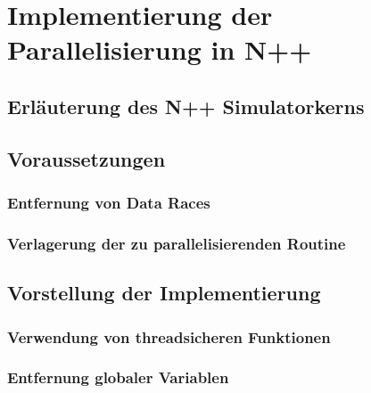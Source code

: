 \chapter{Implementierung der Parallelisierung in N++}
\label{ch:Zielstellung}

\section{Erläuterung des N++ Simulatorkerns}
\label{sec:Zielstellung_Forschungsfrage}

\section{Voraussetzungen}
\label{sec:Implementierung_Voraussetzung}

\subsection{Entfernung von Data Races}
\label{sec:Implementierung_Entfernung_Variablen}

\subsection{Verlagerung der zu parallelisierenden Routine}
\label{sec:Implementierung_Routine}

\section{Vorstellung der Implementierung}
\label{sec:Implementierung_Vorstellung}

\subsection{Verwendung von threadsicheren Funktionen}
\label{sec:Implementierung_Threadsichere_Funktionen}

\subsection{Entfernung globaler Variablen}
\label{sec:Implementierung_Globale_Variablen}